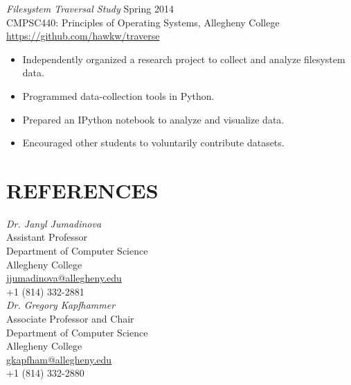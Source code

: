 \documentclass[margin]{res}
\begin{document}
\begin{resume}
        {\sl Filesystem Traversal Study} \hfill Spring 2014 \\
        CMPSC440: Principles of Operating Systems, Allegheny College \\
        \url{https://github.com/hawkw/traverse}
         \begin{itemize} \itemsep -2pt %
            \item Independently organized a research project to collect and analyze filesystem data.
            \item Programmed data-collection tools in Python.
            \item Prepared an IPython notebook to analyze and visualize data.
            \item Encouraged other students to voluntarily contribute datasets.
        \end{itemize}


\section{REFERENCES}
{\sl Dr. Janyl Jumadinova} \hfill \\
Assistant Professor \\ Department of Computer Science \\ Allegheny College \\
\url{jjumadinova@allegheny.edu} \\
+1 (814) 332-2881 \\

{\sl Dr. Gregory Kapfhammer} \hfill \\
Associate Professor and Chair \\ Department of Computer Science \\ Allegheny College \\
\url{gkapfham@allegheny.edu} \\
+1 (814) 332-2880\\
%


\end{resume}
\end{document}
